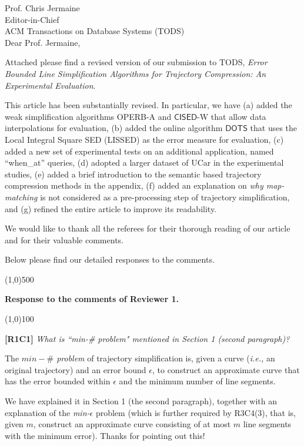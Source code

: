 \documentclass{letter}
\newcommand{\kw}[1]{{\ensuremath {\mathsf{#1}}}\xspace}
\newcommand{\ie}{\emph{i.e.,}\xspace}
\begin{document}
Prof. {Chris Jermaine} \\
Editor-in-Chief		\\
ACM Transactions on Database Systems (TODS)	\\



Dear Prof. Jermaine,

Attached please find a revised version of our submission to
TODS, \emph{Error Bounded Line Simplification Algorithms for Trajectory Compression: An Experimental Evaluation}.


 This article has been substantially revised. In particular, we have
	(a) added the weak simplification algorithms OPERB-A and \kw{CISED}-{W} that allow data interpolations for evaluation,
	(b) added the online algorithm \kw{DOTS} that uses the Local Integral Square SED (LISSED) as the error measure for evaluation,
	(c) added a new set of experimental tests on an additional application, named ``when\_at'' queries,
	(d) adopted a larger dataset of UCar in the experimental studies,
	(e) added a brief introduction to the semantic based trajectory compression methods in the appendix,
    (f) added an explanation on \emph{why map-matching} is not considered as a pre-processing step of trajectory simplification, and
    (g)  refined the entire article to improve its readability.


We would like to thank all the referees for their thorough reading of our article and for their valuable comments.

Below please find our detailed responses to the comments.



\line(1,0){500}

\textbf{Response to the comments of Reviewer 1.}

\line(1,0){100}


\textbf{[R1C1]} \emph{What is ``min-\# problem" mentioned in Section 1 (second paragraph)?}


The \emph{$min-\#$ problem} of trajectory simplification is, given a curve (\ie an original trajectory) and an error bound $\epsilon$, to construct an approximate curve that has the error bounded within $\epsilon$ and the minimum number of line segments.

We have explained it in Section 1 (the second paragraph), together with an explanation of the \emph{min-$\epsilon$} problem (which is further required by R3C4(3), that is, given $m$, construct an approximate curve consisting of at most $m$ line segments with the minimum error).
Thanks for pointing out this!
\end{document}
